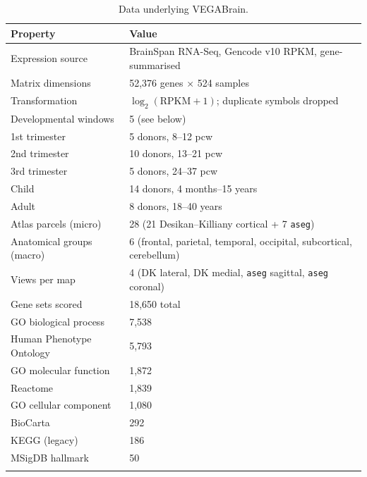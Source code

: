 \documentclass[pdflatex,sn-basic]{sn-jnl}
\begin{document}
\begin{table}[htbp]
\centering
\caption{Data underlying VEGABrain.}\label{tab:data}
\begin{tabular}{@{}ll@{}}
\toprule
Property & Value \\
\midrule
Expression source        & BrainSpan RNA-Seq, Gencode v10 RPKM, gene-summarised \\
Matrix dimensions        & 52{,}376 genes $\times$ 524 samples \\
Transformation           & $\log_2(\mathrm{RPKM}+1)$; duplicate symbols dropped \\
Developmental windows    & 5 (see below) \\
\quad 1st trimester      & 5 donors, 8--12 pcw \\
\quad 2nd trimester      & 10 donors, 13--21 pcw \\
\quad 3rd trimester      & 5 donors, 24--37 pcw \\
\quad Child              & 14 donors, 4 months--15 years \\
\quad Adult              & 8 donors, 18--40 years \\
Atlas parcels (micro)    & 28 (21 Desikan--Killiany cortical + 7 \texttt{aseg}) \\
Anatomical groups (macro)& 6 (frontal, parietal, temporal, occipital, subcortical, cerebellum) \\
Views per map            & 4 (DK lateral, DK medial, \texttt{aseg} sagittal, \texttt{aseg} coronal) \\
Gene sets scored         & 18{,}650 total \\
\quad GO biological process & 7{,}538 \\
\quad Human Phenotype Ontology & 5{,}793 \\
\quad GO molecular function & 1{,}872 \\
\quad Reactome           & 1{,}839 \\
\quad GO cellular component & 1{,}080 \\
\quad BioCarta           & 292 \\
\quad KEGG (legacy)      & 186 \\
\quad MSigDB hallmark    & 50 \\
\botrule
\end{tabular}
\end{table}
\end{document}
